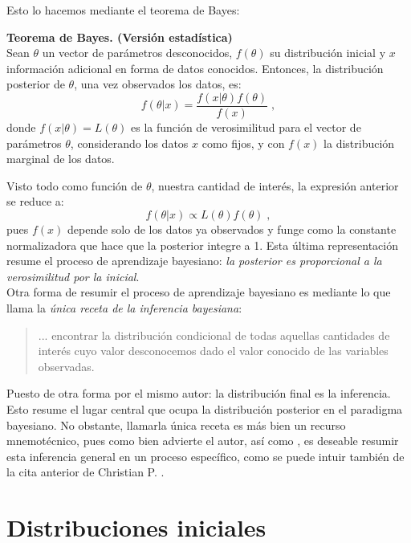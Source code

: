 Esto lo hacemos mediante el teorema de Bayes: 

\begin{teo} \label{teo:Bayes_2}
\textbf{Teorema de Bayes. (Versión estadística)}\\
Sean $\theta$ un vector de parámetros desconocidos, $f(\theta)$ su distribución inicial y $x$ información adicional en forma de datos conocidos. Entonces, la distribución posterior de $\theta$, una vez observados los datos, es: 
\begin{equation*}
f(\theta|x)=\dfrac{f(x|\theta)f(\theta)}{f(x)}\;,
\end{equation*}
donde $f(x|\theta) = L(\theta)$ es la función de verosimilitud para el vector de parámetros $\theta$, considerando los datos $x$ como fijos, y con $f(x)$ la distribución marginal de los datos. 
\end{teo}

Visto todo como función de $\theta$, nuestra cantidad de interés, la expresión anterior se reduce a:  
\begin{equation} \label{equation:Bayes_Prop}
f(\theta|x) \propto L(\theta)f(\theta)\;,
\end{equation}
pues $f(x)$ depende solo de los datos ya observados y funge como la constante normalizadora que hace que la posterior integre a 1. Esta última representación resume el proceso de aprendizaje bayesiano: \textit{la posterior es proporcional a la verosimilitud por la inicial}.\\ 

Otra forma de resumir el proceso de aprendizaje bayesiano es mediante lo que \textcite{GP16} llama la \textit{única receta de la inferencia bayesiana}\label{receta_bayesiana}:
\begin{quote}
... encontrar la distribución condicional de todas aquellas cantidades de interés cuyo valor desconocemos dado el valor conocido de las variables observadas.
\end{quote}
Puesto de otra forma por el mismo autor: la distribución final es la inferencia. Esto resume el lugar central que ocupa la distribución posterior en el paradigma bayesiano. No obstante, llamarla única receta es más bien un recurso mnemotécnico, pues como bien advierte el autor, así como \textcite{Berger85}, es deseable resumir esta inferencia general en un proceso específico, como se puede intuir también de la cita anterior de Christian P. \textcite{Robert07}. 

\section{Distribuciones iniciales}

